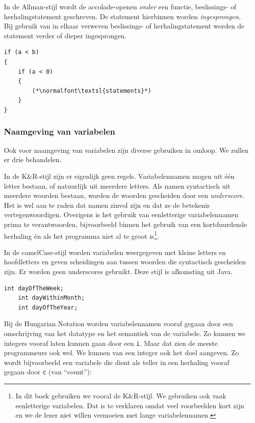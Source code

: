 In de Allman-stijl wordt de accolade-openen \textsl{onder} een functie, beslissings- of herhalingstatement geschreven. De statement hierbinnen worden \textsl{ingesprongen}. Bij gebruik van in elkaar verweven beslissings- of herhalingstatement worden de statement verder of dieper ingesprongen.

\begin{lstlisting}[caption=Allman-stijl.]
if (a < b)
{
    if (a < 0)
    {
        (*\normalfont\textsl{statements}*)
    }
}
\end{lstlisting}

\subsubsection*{Naamgeving van variabelen}

Ook voor naamgeving van variabelen zijn diverse gebruiken in omloop. We zullen er drie behandelen.

In de K\&R-stijl zijn er eigenlijk geen regels. Variabelennamen mogen uit één letter bestaan, of natuurlijk uit meerdere letters. Als namen syntactisch uit meerdere woorden bestaan, worden de woorden gescheiden door een \textsl{underscore}. Het is wel aan te raden dat namen zinvol zijn en dat ze de betekenis vertegenwoordigen. Overigens is het gebruik van eenletterige variabelennamen prima te verantwoorden, bijvoorbeeld binnen het gebruik van een kortduurdende herhaling én als het programma niet al te groot is\footnote{In dit boek gebruiken we vooral de K\&R-stijl. We gebruiken ook vaak eenletterige variabelen. Dat is te verklaren omdat veel voorbeelden kort zijn en we de lezer niet willen vermoeien met lange variabelennamen.}.

In de camelCase-stijl worden variabelen weergegeven met kleine letters en hoofdletters en geven scheidingen aan tussen woorden die syntactisch gescheiden zijn. Er worden geen underscores gebruikt. Deze stijl is afkomsting uit Java.

\begin{lstlisting}[caption=camelCase-stijl.]
    int dayOfTheWeek;
    int dayWithinMonth;
    int dayOfTheYear;
\end{lstlisting}

Bij de Hungarian Notation worden variabelennamen vooraf gegaan door een omschrijving van het datatype en het semantiek van de variabele. Zo kunnen we integers vooraf laten kunnen gaan door een \lstinline|i|. Maar dat zien de meeste programmeurs ook wel. We kunnen van een integer ook het doel aangeven. Zo wordt bijvoorbeeld een variabele die dient als teller in een herhaling vooraf gegaan door \lstinline|c| (van ``count''):


